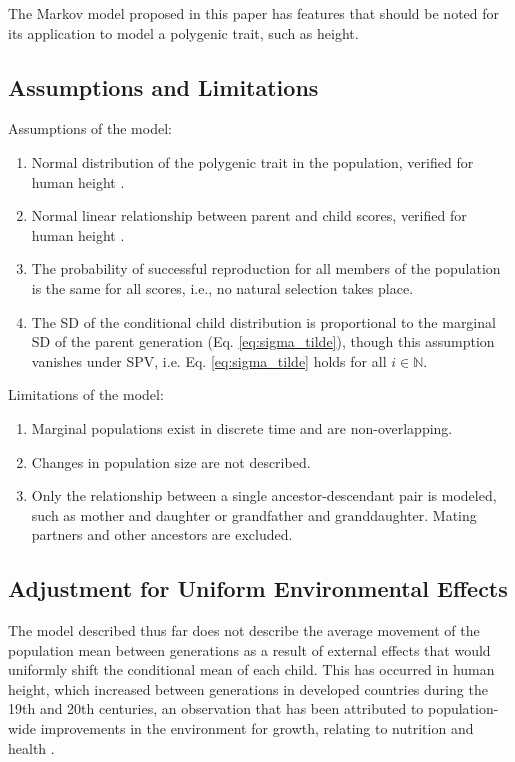 \documentclass{svproc} %
\begin{document}
The Markov model proposed in this paper has features that should be noted for its application to model a polygenic trait, such as height. 

\subsection{Assumptions and Limitations} \label{al}

Assumptions of the model:
\begin{enumerate}
\item Normal distribution of the polygenic trait in the population, verified for human height \cite{luo}. 
\item Normal linear relationship between parent and child scores, verified for human height \cite{luo}. 
\item The probability of successful reproduction for all members of the population is the same for all scores, i.e., no natural selection takes place.
\item The SD of the conditional child distribution is proportional to the marginal SD of the parent generation (Eq. \ref{eq:sigma_tilde}), though this assumption vanishes under SPV, i.e. Eq. \ref{eq:sigma_tilde} holds for all $i \in \mathbb{N}$. 
\end{enumerate}
Limitations of the model:
\begin{enumerate}
\item Marginal populations exist in discrete time and are non-overlapping.
\item Changes in population size are not described. 
\item Only the relationship between a single ancestor-descendant pair is modeled, such as mother and daughter or grandfather and granddaughter. Mating partners and other ancestors are excluded. 
\end{enumerate}

\subsection{Adjustment for Uniform Environmental Effects} \label{adjustment}

The model described thus far does not describe the average movement of the population mean between generations as a result of external effects that would uniformly shift the conditional mean of each child. This has occurred in human height, which increased between generations in developed countries during the 19th and 20th centuries, an observation that has been attributed to population-wide improvements in the environment for growth, relating to nutrition and health \cite{bogin, perkins}. 
\end{document}
